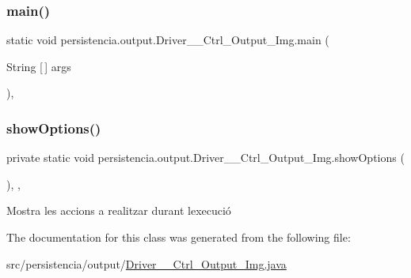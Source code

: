 \subsubsection{\texorpdfstring{main()}{main()}}
{\footnotesize\ttfamily static void persistencia.\+output.\+Driver\+\_\+\+\_\+\+Ctrl\+\_\+\+Output\+\_\+\+Img.\+main (\begin{DoxyParamCaption}\item[{String \mbox{[}$\,$\mbox{]}}]{args }\end{DoxyParamCaption})\hspace{0.3cm}{\ttfamily [inline]}, {\ttfamily [static]}}

\mbox{\label{classpersistencia_1_1output_1_1Driver____Ctrl__Output__Img_a407a2c1e80b099b7cae5dd0a19683d09}} 
\subsubsection{\texorpdfstring{show\+Options()}{showOptions()}}
{\footnotesize\ttfamily private static void persistencia.\+output.\+Driver\+\_\+\+\_\+\+Ctrl\+\_\+\+Output\+\_\+\+Img.\+show\+Options (\begin{DoxyParamCaption}{ }\end{DoxyParamCaption})\hspace{0.3cm}{\ttfamily [inline]}, {\ttfamily [static]}, {\ttfamily [private]}}



Mostra les accions a realitzar durant l\textquotesingle{}execució 



The documentation for this class was generated from the following file\+:\begin{DoxyCompactItemize}
\item 
src/persistencia/output/\hyperlink{Driver____Ctrl__Output__Img_8java}{Driver\+\_\+\+\_\+\+Ctrl\+\_\+\+Output\+\_\+\+Img.\+java}\end{DoxyCompactItemize}
